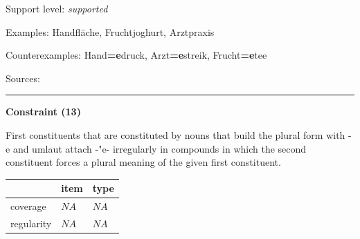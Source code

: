 \vspace{-1.35em}

\noindent
Support level: \textit{supported}

\vspace{0.3em}

\noindent
Examples: Hand{\zeroLinker}fläche, Frucht{\zeroLinker}joghurt, Arzt{\zeroLinker}praxis

\noindent
Counterexamples: Hand\textbf{=e}druck, Arzt\textbf{=e}streik, Frucht\textbf{=e}tee

\vspace{0.3em}

\noindent
Sources: \citet[83, 107]{ortner_mueller-bollhagen_1991}

\vspace{0.35em}
\hrule




\vspace{0.4em}

\begin{center}
\textbf{Constraint (13)}
\end{center}

\noindent
First constituents that are constituted by nouns that build the plural form with -e and umlaut attach -"e- irregularly in compounds in which the second constituent forces a plural meaning of the given first constituent.
\vspace{0.5em}


\vspace{-0.25em}

\begin{table}[!ht]
\begin{center}
\setlength{\extrarowheight}{1pt}
\begin{tabularx}{\columnwidth}{|X|X|X|}
\hline
 & item & type \\
\hline
 coverage & $NA$ & $NA$ \\
\hline
 regularity & $NA$ & $NA$ \\
\hline
\end{tabularx}
\end{center}
\end{table}

